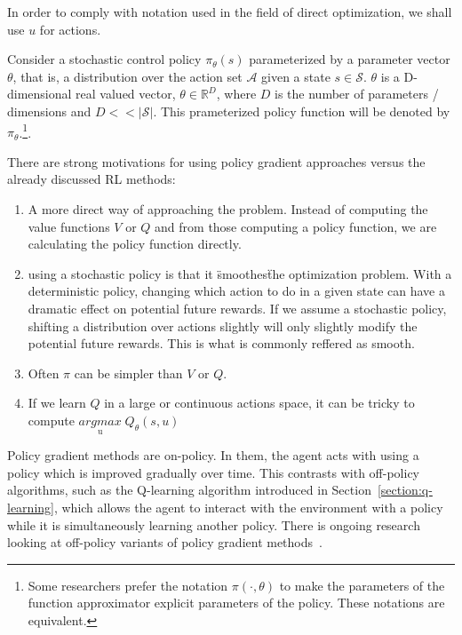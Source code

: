 \documentclass{../main.tex}{subfiles}
\begin{document}
In order to comply with notation used in the field of direct optimization, we shall use $u$ for actions.

Consider a stochastic control policy  $\pi_{\theta}(s)$ parameterized by a parameter vector $\theta$, that is, a distribution over the action set $\mathcal{A}$ given a state $s \in \mathcal{S}$. $\theta$ is a D-dimensional real valued vector, $\theta \in \mathbb{R}^{D}$, where $D$ is the number of parameters / dimensions and $D << |\mathcal{S}|$. This prameterized policy function will be denoted by $\pi_{\theta}$.\footnote{Some researchers prefer the notation $\pi(\cdot, \theta)$ to make the parameters of the function approximator explicit parameters of the policy. These notations are equivalent.}. 



There are strong motivations for using policy gradient approaches versus the already discussed RL methods:
\begin{enumerate}
\item A more direct way of approaching the problem. Instead of computing the value functions $V$ or $Q$ and from those computing a policy function, we are calculating the policy function directly.
\item using a stochastic policy is that it \"smoothes\" the optimization problem. With a deterministic policy, changing which action to do in a given state can have a dramatic effect on potential future rewards. If we assume a stochastic policy, shifting a distribution over actions slightly will only slightly modify the potential future rewards. This is what is commonly reffered as smooth.
\item Often $\pi$ can be simpler than $V$ or $Q$.
\item If we learn $Q$ in a large or continuous actions space, it can be tricky to compute $\underset{\text{u}}{argmax}\; Q_{\theta}(s,u)$
\end{enumerate}
 
Policy gradient methods are on-policy. In them, the agent acts with using a policy which is improved gradually over time. This contrasts with off-policy algorithms, such as the Q-learning algorithm introduced in Section~\ref{section:q-learning}, which allows the agent to interact with the environment with a policy while it is simultaneously learning another policy. There is ongoing research looking at off-policy variants of policy gradient methods~\citep{Mnih2013, Mnih2016}. 
\end{document}
